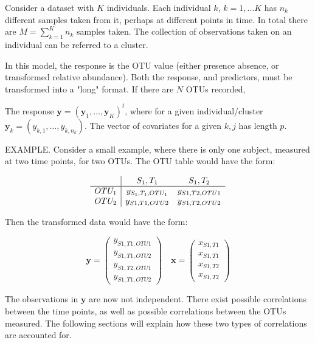 \documentclass[12pt]{article}
\begin{document}
Consider a dataset with $K$ individuals. Each individual $k$, $k = 1, \ldots K$ has $n_k$ different samples taken from it, perhaps at different points in time. In total there are $M = \sum_{k=1}^K n_k$ samples taken. The collection of observations taken on an individual can be referred to a cluster.


In this model, the response is the OTU value (either presence absence, or transformed relative abundance). Both the response, and predictors, must be transformed into a "long" format. If there are $N$ OTUs recorded,

The response $\mathbf{y} = (\mathbf{y}_1, \ldots, \mathbf{y}_K)^t$, where for a given individual/cluster $\mathbf{y}_k = (y_{k,1}, \ldots, y_{k,n_k})$. The vector of covariates for a given $k,j$ has length $p$.

EXAMPLE. Consider a small example, where there is only one subject, measured at two time points, for two OTUs. The OTU table would have the form:

$$
\begin{array}{c| c c}
  & S_1,T_1 & S_1,T_2\\
  \hline
  OTU_1 & y_{S_1,T_1,OTU_1} & y_{S1,T2,OTU1}\\
  OTU_2 & y_{S1,T1,OTU2} & y_{S1,T2,OTU2}\\
\end{array}
$$

Then the transformed data would have the form:

$$
\mathbf{y} = \begin{pmatrix}
    y_{S1,T1,OTU1}\\
    y_{S1,T1,OTU2}\\
    y_ {S1,T2,OTU1}\\
    y_{S1,T1,OTU2}
\end{pmatrix} \quad
\mathbf{x} = \begin{pmatrix}
      x_{S1,T1}\\
      x_{S1,T1}\\
      x_{S1,T2}\\
      x_{S1,T2}
\end{pmatrix}$$

The observations in $\mathbf{y}$ are now not independent. There exist possible correlations between the time points, as well as possible correlations between the OTUs measured. The following sections will explain how these two types of correlations are accounted for.
\end{document}

